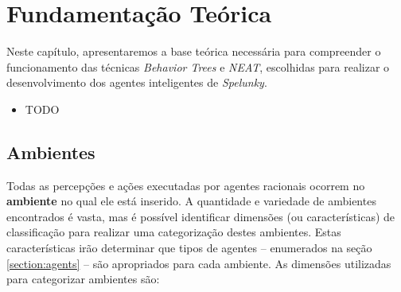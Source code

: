 \chapter{\label{chap:theory}Fundamentação Teórica}
Neste capítulo, apresentaremos a base teórica necessária para compreender o
funcionamento das técnicas \textit{Behavior Trees} e \textit{NEAT}, escolhidas
para realizar o desenvolvimento dos agentes inteligentes de \textit{Spelunky}.

\begin{mdframed}[backgroundcolor=green!20]
\begin{itemize}
	\item
		TODO
\end{itemize}
\end{mdframed}


\section{\label{section:environment}Ambientes}
Todas as percepções e ações executadas por agentes racionais ocorrem no
\textbf{ambiente} no qual ele está inserido. A quantidade e variedade de
ambientes encontrados é vasta, mas é possível identificar dimensões (ou
características) de classificação para realizar uma categorização destes
ambientes. Estas características irão determinar que tipos de agentes --
enumerados na seção \ref{section:agents} -- são apropriados para cada ambiente.
As dimensões utilizadas para categorizar ambientes são:

